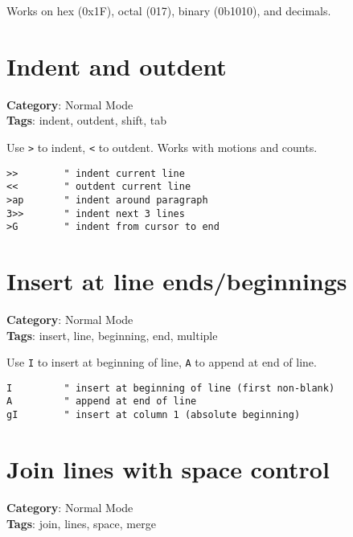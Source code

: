 {{{{{{{{{{Works on hex (0x1F), octal (017), binary (0b1010), and decimals.

\section{Indent and outdent}

\textbf{Category}: Normal Mode\\ \textbf{Tags}: indent, outdent, shift, tab
\vspace{0.5cm}

Use {\footnotesize \Verb§>§} to indent, {\footnotesize \Verb§<§} to outdent. Works with motions and counts.

\begin{Exa*}{}
\begin{Verbatim}[fontsize=\footnotesize, breaklines, breakanywhere]
>>        " indent current line
<<        " outdent current line
>ap       " indent around paragraph
3>>       " indent next 3 lines
>G        " indent from cursor to end
\end{Verbatim}
\end{Exa*}

\section{Insert at line ends/beginnings}

\textbf{Category}: Normal Mode\\ \textbf{Tags}: insert, line, beginning, end, multiple
\vspace{0.5cm}

Use {\footnotesize \Verb§I§} to insert at beginning of line, {\footnotesize \Verb§A§} to append at end of line.

\begin{Exa*}{}
\begin{Verbatim}[fontsize=\footnotesize, breaklines, breakanywhere]
I         " insert at beginning of line (first non-blank)
A         " append at end of line
gI        " insert at column 1 (absolute beginning)
\end{Verbatim}
\end{Exa*}

\section{Join lines with space control}

\textbf{Category}: Normal Mode\\ \textbf{Tags}: join, lines, space, merge
\vspace{0.5cm}

}}}}}}}}}}
